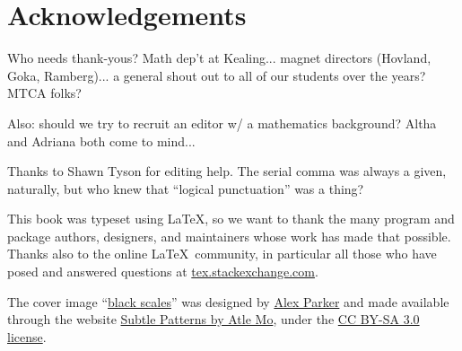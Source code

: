 \chapter{Acknowledgements}
\label{ch:acknowledgements}

Who needs thank-yous? Math dep't at Kealing... magnet directors (Hovland, Goka, Ramberg)... a general shout out to all of our students over the years? MTCA folks?

Also: should we try to recruit an editor w/ a mathematics background? Altha and Adriana both come to mind...

Thanks to Shawn Tyson for editing help. The serial comma was always a given, naturally, but who knew that ``logical punctuation'' was a thing?

This book was typeset using \LaTeX, so we want to thank the many program and package authors, designers, and maintainers whose work has made that possible. Thanks also to the online \LaTeX\ community, in particular all those who have posed and answered questions at \href{http://tex.stackexchange.com/}{tex.stackexchange.com}.

The cover image ``\href{http://subtlepatterns.com/black-scales/}{black scales}'' was designed by \href{https://twitter.com/misterparker}{Alex Parker} and made available through the website \href{http://subtlepatterns.com/}{Subtle Patterns by Atle Mo}, under the \href{http://creativecommons.org/licenses/by-sa/3.0/}{CC BY-SA 3.0 license}.
